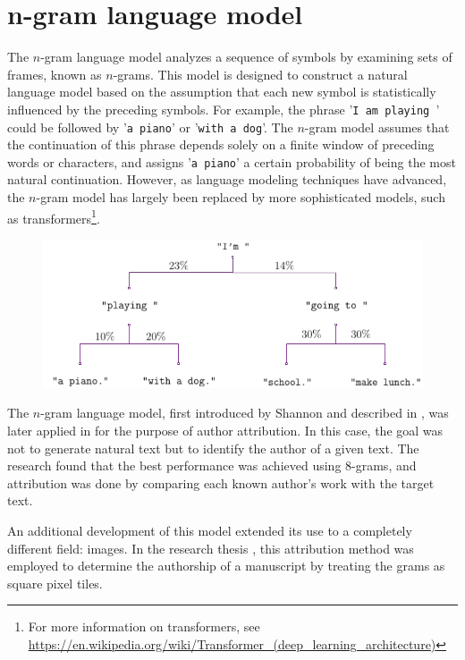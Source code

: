 \section{n-gram language model}
The $n$-gram language model analyzes a sequence of symbols by examining sets of frames, known as $n$-grams. This model is designed to construct a natural language model based on the assumption that each new symbol is statistically influenced by the preceding symbols. For example, the phrase '\texttt{I am playing }' could be followed by '\texttt{a piano}' or '\texttt{with a dog}'. The $n$-gram model assumes that the continuation of this phrase depends solely on a finite window of preceding words or characters, and assigns '\texttt{a piano}' a certain probability of being the most natural continuation. However, as language modeling techniques have advanced, the $n$-gram model has largely been replaced by more sophisticated models, such as transformers\footnote{For more information on transformers, see \url{https://en.wikipedia.org/wiki/Transformer_(deep_learning_architecture)}}.

\begin{figure}[ht]
	\centering
	\includegraphics[width=\linewidth]{Figures/exngrammodel.png}
\end{figure}

\noindent The $n$-gram language model, first introduced by Shannon and described in \citet{Shannon_ngrammodel}, was later applied in \citet{SapAttribution} for the purpose of author attribution. In this case, the goal was not to generate natural text but to identify the author of a given text. The research found that the best performance was achieved using $8$-grams, and attribution was done by comparing each known author's work with the target text.

\noindent An additional development of this model extended its use to a completely different field: images. In the research thesis \cite{thesis}, this attribution method was employed to determine the authorship of a manuscript by treating the grams as square pixel tiles.

